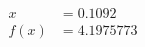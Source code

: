 \documentclass[preview]{standalone}
\begin{document}
\begin{align*}
x &= 0.1092\\f(x) &= 4.1975773
\end{align*}
\end{document}
